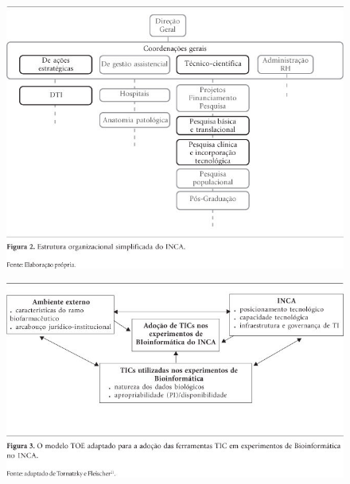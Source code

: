 \documentclass{article}
\begin{document}
\begin{figure}
\includegraphics[width=\textwidth]{1413-8123-csc-19-01-00257-gf03}
\caption{}\label{fig:f03}
\end{figure}
\begin{figure}
\includegraphics[width=\textwidth]{1413-8123-csc-19-01-00257-gf04}
\caption{}\label{fig:f04}
\end{figure}
\end{document}
